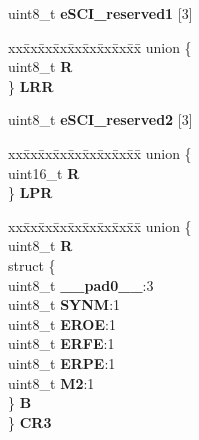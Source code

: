 \begin{DoxyCompactItemize}
\begin{tabbing}
\end{tabbing}\item 
\mbox{\label{structESCI__tag_a8332758f6768089e0437e07afdbac8f4}} 
uint8\+\_\+t {\bfseries e\+S\+C\+I\+\_\+reserved1} \mbox{[}3\mbox{]}
\item 
\mbox{\label{structESCI__tag_a346ff3ec0d555c1513af8e4024266547}} 
\begin{tabbing}
xx\=xx\=xx\=xx\=xx\=xx\=xx\=xx\=xx\=\kill
union \{\\
\>uint8\_t {\bfseries R}\\
\} {\bfseries LRR}\\

\end{tabbing}\item 
\mbox{\label{structESCI__tag_adc45f6dbf43aebba4dbcf728cc37d8dc}} 
uint8\+\_\+t {\bfseries e\+S\+C\+I\+\_\+reserved2} \mbox{[}3\mbox{]}
\item 
\mbox{\label{structESCI__tag_ad7e6ed88f874e38fd7a4717866d2f306}} 
\begin{tabbing}
xx\=xx\=xx\=xx\=xx\=xx\=xx\=xx\=xx\=\kill
union \{\\
\>uint16\_t {\bfseries R}\\
\} {\bfseries LPR}\\

\end{tabbing}\item 
\mbox{\label{structESCI__tag_a2d9562e9204a7d0f8ee6de09fa0a7452}} 
\begin{tabbing}
xx\=xx\=xx\=xx\=xx\=xx\=xx\=xx\=xx\=\kill
union \{\\
\>uint8\_t {\bfseries R}\\
\>struct \{\\
\>\>uint8\_t {\bfseries \_\_pad0\_\_}:3\\
\>\>uint8\_t {\bfseries SYNM}:1\\
\>\>uint8\_t {\bfseries EROE}:1\\
\>\>uint8\_t {\bfseries ERFE}:1\\
\>\>uint8\_t {\bfseries ERPE}:1\\
\>\>uint8\_t {\bfseries M2}:1\\
\>\} {\bfseries B}\\
\} {\bfseries CR3}\\


\end{tabbing}
\end{DoxyCompactItemize}
